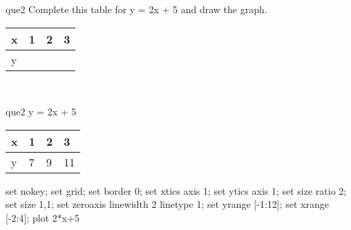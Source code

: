 \documentclass[13.5pt, varwidth=true]{beamer}
\begin{document}
\begin{frame}[shrink=19,fragile]
	\begin{beamercolorbox}[rounded=true, left, shadow=true,wd=14.8cm]{que2}
		 Complete this table for y = 2x + 5 and draw the graph. \\[0.3cm] \renewcommand{\arraystretch}{1.2}\begin{tabular}{|C|C|C|C|} \hline x & 1 & 2 & 3 \\ \hline y & & & \\ \hline \end{tabular}\\[0.3cm]
	\end{beamercolorbox}
\end{frame}
\begin{frame}[shrink=19,fragile]
	\begin{beamercolorbox}[rounded=true, left, shadow=true,wd=14.8cm]{que2}
		y = 2x + 5\renewcommand{\arraystretch}{1.2}\begin{tabular}{|C|C|C|C|} \hline x & 1 & 2 & 3 \\ \hline y & 7 & 9 & 11\\ \hline \end{tabular}\begin{gnuplot}[terminal=pdf] set nokey; set grid; set border 0; set xtics axis 1; set ytics axis 1; set size ratio 2; set size 1,1; set zeroaxis linewidth 2 linetype 1; set yrange [-1:12]; set xrange [-2:4]; plot 2*x+5 \end{gnuplot}
	\end{beamercolorbox}
\end{frame}
\end{document}
